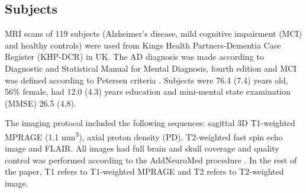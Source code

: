 \subsection{Subjects} \label{subjects}
MRI scans of 119 subjects (Alzheimer’s disease, mild cognitive impairment (MCI) and healthy controls) were used from Kings Health Partners-Dementia Case Register (KHP-DCR) in UK. The AD diagnosis was made according to Diagnostic and Statistical Manual for Mental Diagnosis, fourth edition and MCI was defined according to Petersen criteria \cite{PetersonMCI}. Subjects were 76.4 (7.4) years old, 56\% female, had 12.0 (4.3) years education and mini-mental state examination (MMSE) 26.5 (4.8).
\par
The imaging protocol included the following sequences: sagittal 3D T1-weighted MPRAGE (1.1 mm\textsuperscript{3}), axial proton density (PD), T2-weighted fast spin echo image and FLAIR. All images had full brain and skull coverage and quality control was performed according to the AddNeuroMed procedure \cite{AddNeuroMed}. In the rest of the paper, T1 refers to T1-weighted MPRAGE and T2 refers to T2-weighted image.

  
  
  
  